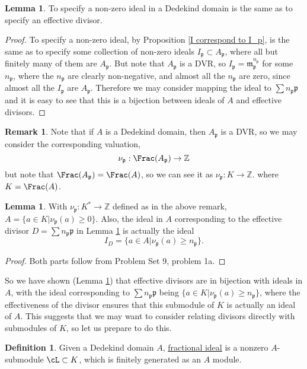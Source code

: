 \documentclass[12 pt]{article}
\theoremstyle{definition}
\newtheorem{lemma}[thm]{Lemma}
\newtheorem{defn}[thm]{Definition}
\newtheorem{rmk}[thm]{Remark}
\renewcommand{\(}{\left(}
\renewcommand{\)}{\right)}
\newcommand\zz{\mathbb{Z}}
\newcommand\fp{{\mathfrak p}}
\newcommand\fm{{\mathfrak m}}
\begin{document}
\begin{lemma} To specify a non-zero ideal in a Dedekind domain is the same as to specify an effective divisor.
\label{Dedekind means nonzero ideals are effective divisors}
\end{lemma}
\begin{proof} To specify a non-zero ideal, by Proposition \ref{I correspond to I_p}, is the same as to specify some collection of non-zero ideals $I_{\fp} \subset A_{\fp}$, where all but finitely many of them are $A_{\fp}$. But note that $A_{\fp}$ is a DVR, so $I_{\fp}=\fm_{\fp}^{n_\fp}$ for some $n_{\fp}$, where the $n_{\fp}$ are clearly non-negative, and almost all the $n_{\fp}$ are zero, since almost all the $I_{\fp}$ are $A_{\fp}$. Therefore we may consider mapping the ideal to $\sum n_{\fp} \fp$ and it is easy to see that this is a bijection between ideals of $A$ and effective divisors.
\end{proof}
\begin{rmk} Note that if $A$ is a Dedekind domain, then $A_{\fp}$ is a DVR, so we may consider the corresponding valuation,
\[\nu_{\fp}:\Frac(A_{\fp}) \to \zz\]
but note that $\Frac(A_{\fp})=\Frac(A)$, so we can see it as $\nu_{\fp}:K \to \zz$. where $K=\Frac(A)$.
\label{valuations remark}
\end{rmk}

\begin{lemma} With $\nu_{\fp}:K^* \to \zz$ defined as in the above remark, $A=\{a \in K| \nu_{\fp}(a) \geq 0\}$. Also, the ideal in $A$ corresponding to the effective divisor $D= \sum n_{\fp} \fp$ in Lemma \ref{Dedekind means nonzero ideals are effective divisors} is actually the ideal
\[I_D=\{a \in A| \nu_{\fp}(a) \geq n_{\fp}\}.\]
\label{Dedekind means ideals=eff div, valuations version}
\end{lemma}
\begin{proof} Both parts follow from Problem Set 9, problem 1a.
\end{proof}


So we have shown (Lemma \ref{Dedekind means ideals=eff div, valuations version}) that effective divisors are in bijection with ideals in $A$, with the ideal corresponding to $\sum n_{\fp} \fp$ being $\{a \in K|\nu_{\fp}(a) \geq n_{\fp}\}$, where the effectiveness of the divisor ensures that this submodule of $K$ is actually an ideal of $A$. This suggests that we may want to consider relating divisors directly with submodules of $K$, so let us prepare to do this.


\begin{defn} Given a Dedekind domain $A$, \uline{fractional ideal} is a nonzero $A$-submodule $\cL \subset K$, which is finitely generated as an $A$ module.
\end{defn}
\end{document}
